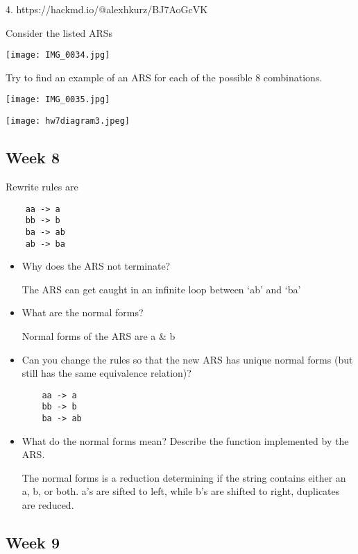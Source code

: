 \documentclass{article}
\theoremstyle{theorem}
\theoremstyle{definition}
\theoremstyle{remark}
\begin{document}
4.  https://hackmd.io/@alexhkurz/BJ7AoGcVK

Consider the listed ARSs

\texttt{[image: IMG\_0034.jpg]}

Try to find an example of an ARS for each of the possible 8 combinations.

\texttt{[image: IMG\_0035.jpg]}

\texttt{[image: hw7diagram3.jpeg]}

\subsection{Week 8}
Rewrite rules are
\begin{verbatim}
    aa -> a
    bb -> b
    ba -> ab
    ab -> ba
\end{verbatim}
\begin{itemize}
\item Why does the ARS not terminate?

The ARS can get caught in an infinite loop between ‘ab’ and ‘ba’

\item What are the normal forms?

Normal forms of the ARS are a & b

\item Can you change the rules so that the new ARS has unique normal forms (but still has the same equivalence relation)?
\begin{verbatim}
    aa -> a
    bb -> b
    ba -> ab
\end{verbatim}
\item What do the normal forms mean? Describe the function implemented by the ARS.

The normal forms is a reduction determining if the string contains either an a, b, or both.
a’s are sifted to left, while b’s are shifted to right, duplicates are reduced.
\end{itemize}

\subsection{Week 9}
\end{document}
